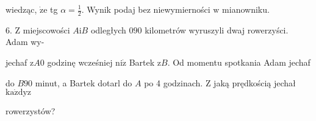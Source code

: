 \documentclass[a4paper,12pt]{article}
\begin{document}
wiedząc, $\dot{\mathrm{z}}\mathrm{e}$ tg $\displaystyle \alpha=\frac{1}{2}$. Wynik podaj bez niewymierności $\mathrm{w}$ mianowniku.

6. $\mathrm{Z}$ miejscowości $A\mathrm{i}B$ odległych $090$ kilometrów wyruszyli dwaj rowerzyści. Adam wy-

jechaf $\mathrm{z} A0$ godzinę wcześniej $\mathrm{n}\mathrm{i}\dot{\mathrm{z}}$ Bartek $\mathrm{z} B$. Od momentu spotkania Adam jechaf

do $B90$ minut, a Bartek dotarl do $A$ po 4 godzinach. $\mathrm{Z}$ jaką prędkością jechał $\mathrm{k}\mathrm{a}\dot{\mathrm{z}}\mathrm{d}\mathrm{y}\mathrm{z}$

rowerzystów?
\end{document}

